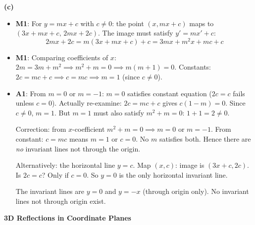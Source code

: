 \documentclass[11pt,a4paper]{article}
\begin{document}
{\begin{itemize}[leftmargin=1.5em, itemsep=2pt]
  \end{itemize}
  \textbf{(c)}
  \begin{itemize}[leftmargin=1.5em, itemsep=2pt]
    \item \textbf{M1}: For $y = mx + c$ with $c \neq 0$: the point $(x, mx + c)$ maps to $(3x + mx + c,\, 2mx + 2c)$. The image must satisfy $y' = mx' + c$:
    \[
    2mx + 2c = m(3x + mx + c) + c = 3mx + m^2 x + mc + c
    \]
    \item \textbf{M1}: Comparing coefficients of $x$: $2m = 3m + m^2 \implies m^2 + m = 0 \implies m(m+1) = 0$.
    Constants: $2c = mc + c \implies c = mc \implies m = 1$ (since $c \neq 0$).
    \item \textbf{A1}: From $m = 0$ or $m = -1$: $m = 0$ satisfies constant equation ($2c = c$ fails unless $c = 0$). Actually re-examine: $2c = m c + c$ gives $c(1 - m) = 0$. Since $c \neq 0$, $m = 1$. But $m = 1$ must also satisfy $m^2 + m = 0$: $1 + 1 = 2 \neq 0$.

    Correction: from $x$-coefficient $m^2 + m = 0 \implies m = 0$ or $m = -1$. From constant: $c = mc$ means $m = 1$ or $c = 0$. No $m$ satisfies both. Hence there are \emph{no} invariant lines not through the origin.

    Alternatively: the horizontal line $y = c$. Map $(x, c)$: image is $(3x + c, 2c)$. Is $2c = c$? Only if $c = 0$. So $y = 0$ is the only horizontal invariant line.

    The invariant lines are $y = 0$ and $y = -x$ (through origin only). No invariant lines not through origin exist.
  \end{itemize}
}


\vspace{10pt}

 \textbf{3D Reflections in Coordinate Planes}
\end{document}
